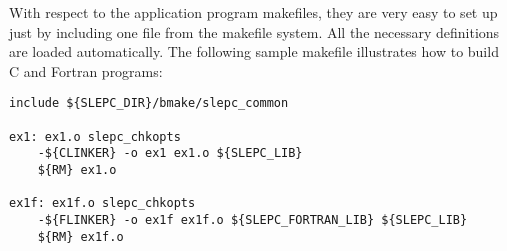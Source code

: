 	With respect to the application program makefiles, they are very easy to set up just by including one file from the \slepc makefile system. All the necessary \petsc{} definitions are loaded automatically. The following sample makefile illustrates how to build C and Fortran programs:

	\begin{Verbatim}[fontsize=\scriptsize]
include ${SLEPC_DIR}/bmake/slepc_common

ex1: ex1.o slepc_chkopts
	-${CLINKER} -o ex1 ex1.o ${SLEPC_LIB}
	${RM} ex1.o

ex1f: ex1f.o slepc_chkopts
	-${FLINKER} -o ex1f ex1f.o ${SLEPC_FORTRAN_LIB} ${SLEPC_LIB}
	${RM} ex1f.o
	\end{Verbatim}


